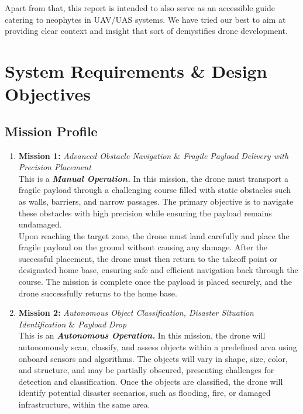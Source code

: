 \documentclass[12pt]{report}
\begin{document}
    \noindent Apart from that, this report is intended to also serve as an accessible guide catering to neophytes in UAV/UAS systems. We have tried our best to aim at providing clear context and insight that sort of demystifies drone development.

  \chapter{System Requirements \& Design Objectives}
    \section{Mission Profile}
    \begin{enumerate}
      \item \textbf{Mission 1:} \textit{Advanced Obstacle Navigation $\&$ Fragile Payload Delivery with Precision Placement} \\
        This is a \textbf{\textit{Manual Operation.}} In this mission, the drone must transport a fragile payload through a challenging course filled with static obstacles such as walls, barriers, and narrow passages. The primary objective is to navigate these obstacles with high precision while ensuring the payload remains undamaged. \\
        
        Upon reaching the target zone, the drone must land carefully and place the fragile payload on the ground without causing any damage. After the successful placement, the drone must then return to the takeoff point or designated home base, ensuring safe and efficient navigation back through the course. The mission is complete once the payload is placed securely, and the drone successfully returns to the home base.
      \item \textbf{Mission 2:} \textit{Autonomous Object Classification, Disaster Situation Identification $\&$ Payload Drop }\\
        This is an \textbf{\textit{Autonomous Operation.}} In this mission, the drone will autonomously scan, classify, and assess objects within a predefined area using onboard sensors and algorithms. The objects will vary in shape, size, color, and structure, and may be partially obscured, presenting challenges for detection and classification. Once the objects are classified, the drone will identify potential disaster scenarios, such as flooding, fire, or damaged infrastructure, within the same area.
    \end{enumerate}
\end{document}
